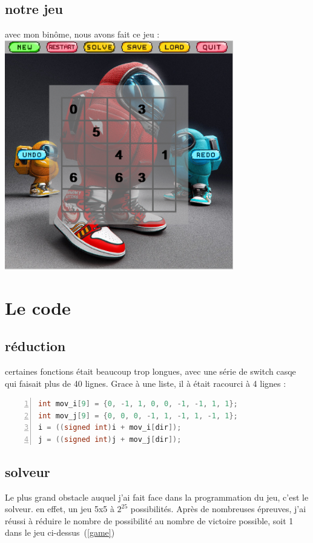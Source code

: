 \documentclass{article}
\begin{document}
        \subsection{notre jeu}
            avec mon binôme\cite{binome}, nous avons fait ce jeu :\\
            \includegraphics[height=10cm]{game.png}
    \section{Le code}
        \subsection{réduction}
            certaines fonctions était beaucoup trop longues, avec une série de switch casqe qui faisait plus de 40 lignes. 
            Grace à une liste, il à était racourci à 4 lignes :
            \begin{lstlisting}[language=c, numbers=left, frame=single]
int mov_i[9] = {0, -1, 1, 0, 0, -1, -1, 1, 1};
int mov_j[9] = {0, 0, 0, -1, 1, -1, 1, -1, 1};
i = ((signed int)i + mov_i[dir]);
j = ((signed int)j + mov_j[dir]);
            \end{lstlisting}
            \clearpage
        \subsection{solveur}
            Le plus grand obstacle auquel j'ai fait face dans la programmation du jeu, c'est le solveur. en effet, un jeu 5x5 à $2^{25}$ possibilités.
            Après de nombreuses épreuves, j'ai réussi à réduire le nombre de possibilité au nombre de victoire possible, soit 1 dans le jeu ci-dessus~(\ref{game})

    
    
        
\end{document}
